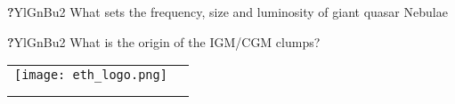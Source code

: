 \documentclass[portrait,a0,final]{a0poster}
\begin{document}
\begin{center}
\begin{minipage}{0.9\linewidth}
    \vspace{2cm}
    \begin{minipage}{0.47\linewidth}

      \begin{gbox}{\textbf{{\LARGE ?}}}{YlGnBu2}{}
        {\Large What sets the frequency, size and luminosity of giant quasar
          Nebulae}
      \end{gbox}

      

      

    \end{minipage}\hfill
    \begin{minipage}{0.47\linewidth}

      

      \begin{gbox}{\textbf{{\LARGE ?}}}{YlGnBu2}{}
        {\Large What is the origin of the IGM/CGM clumps?}
      \end{gbox}

      

    \end{minipage}
  \end{minipage}
\end{center}


\newpage


\begin{center}
  \begingroup\setlength{\fboxsep}{1cm}\colorbox{Norway4}{
    \begin{tabular}{L{0.29\textwidth} R{0.62\textwidth}}
      \texttt{[image: eth\_logo.png]}
      &  \\

       & \\

      &  \\
    \end{tabular}
  }\endgroup
\end{center}
\end{document}
